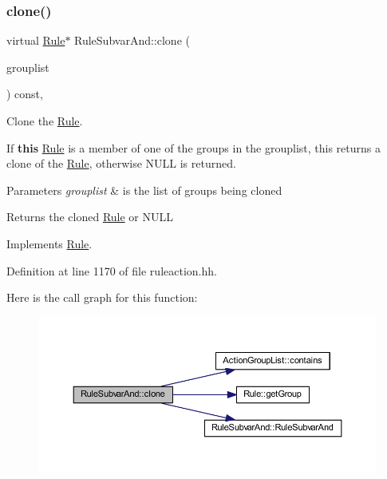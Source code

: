 \subsubsection{\texorpdfstring{clone()}{clone()}}
{\footnotesize\ttfamily virtual \mbox{\hyperlink{class_rule}{Rule}}$\ast$ Rule\+Subvar\+And\+::clone (\begin{DoxyParamCaption}\item[{const \mbox{\hyperlink{class_action_group_list}{Action\+Group\+List}} \&}]{grouplist }\end{DoxyParamCaption}) const\hspace{0.3cm}{\ttfamily [inline]}, {\ttfamily [virtual]}}



Clone the \mbox{\hyperlink{class_rule}{Rule}}. 

If {\bfseries{this}} \mbox{\hyperlink{class_rule}{Rule}} is a member of one of the groups in the grouplist, this returns a clone of the \mbox{\hyperlink{class_rule}{Rule}}, otherwise N\+U\+LL is returned. 
\begin{DoxyParams}{Parameters}
{\em grouplist} & is the list of groups being cloned \\
\hline
\end{DoxyParams}
\begin{DoxyReturn}{Returns}
the cloned \mbox{\hyperlink{class_rule}{Rule}} or N\+U\+LL 
\end{DoxyReturn}


Implements \mbox{\hyperlink{class_rule_a70de90a76461bfa7ea0b575ce3c11e4d}{Rule}}.



Definition at line 1170 of file ruleaction.\+hh.

Here is the call graph for this function\+:
\nopagebreak
\begin{figure}[H]
\begin{center}
\leavevmode
\includegraphics[width=350pt]{class_rule_subvar_and_a342d056bd7dddb26c80742c518f74ea9_cgraph}
\end{center}
\end{figure}
\mbox{\label{class_rule_subvar_and_aba94563586cb1a9de571f1cd6fe737db}} 
